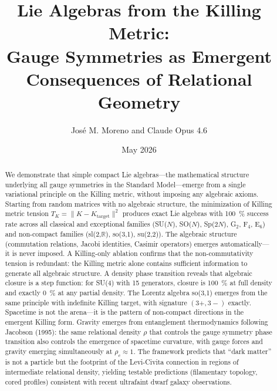 \documentclass[aps,prd,amsmath,amssymb,superscriptaddress,groupedaddress,nofootinbib]{revtex4-2}
\begin{document}
\title[Lie Algebras from the Killing Metric: Gauge Symmetries as Emergent Consequences of Relational Geometry]{Lie Algebras from the Killing Metric:\\Gauge Symmetries as Emergent Consequences of Relational Geometry}
\author{José M. Moreno and Claude Opus 4.6}
\date{May 2026}

\begin{abstract}
We demonstrate that simple compact Lie algebras---the mathematical structure underlying all gauge symmetries in the Standard Model---emerge from a single variational principle on the Killing metric, without imposing any algebraic axioms. Starting from random matrices with no algebraic structure, the minimization of Killing metric tension $T_K = \|K - K_{\mathrm{target}}\|^2$ produces exact Lie algebras with \SI{100}{\percent} success rate across all classical and exceptional families (SU($N$), SO($N$), Sp($2N$), G$_2$, F$_4$, E$_6$) and non-compact families (sl(2,$\mathbb{R}$), so(3,1), su(2,2)). The algebraic structure (commutation relations, Jacobi identities, Casimir operators) emerges automatically---it is never imposed. A Killing-only ablation confirms that the non-commutativity tension is redundant: the Killing metric alone contains sufficient information to generate all algebraic structure. A density phase transition reveals that algebraic closure is a step function: for SU(4) with 15 generators, closure is \SI{100}{\percent} at full density and exactly \SI{0}{\percent} at any partial density. The Lorentz algebra so(3,1) emerges from the same principle with indefinite Killing target, with signature $(3+,3-)$ exactly. Spacetime is not the arena---it is the pattern of non-compact directions in the emergent Killing form. Gravity emerges from entanglement thermodynamics following Jacobson (1995): the same relational density $\rho$ that controls the gauge symmetry phase transition also controls the emergence of spacetime curvature, with gauge forces and gravity emerging simultaneously at $\rho_c \approx 1$. The framework predicts that ``dark matter'' is not a particle but the footprint of the Levi-Civita connection in regions of intermediate relational density, yielding testable predictions (filamentary topology, cored profiles) consistent with recent ultrafaint dwarf galaxy observations.
\end{abstract}


\maketitle















\end{document}
